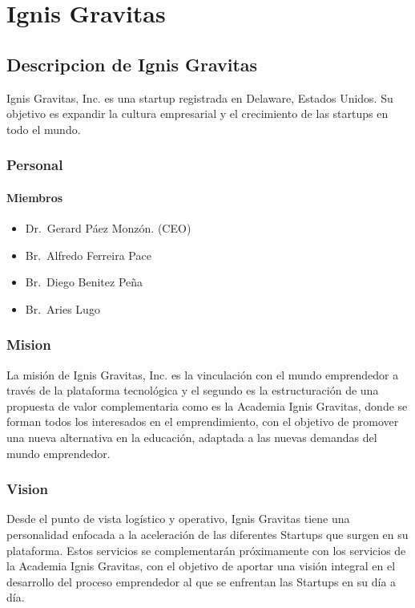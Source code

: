\chapter{Ignis Gravitas}

\section{Descripcion de Ignis Gravitas} \label{App:DescripcionLasdai}

Ignis Gravitas, Inc. es una startup registrada en Delaware, Estados Unidos. Su objetivo es expandir la cultura empresarial y el crecimiento de las startups en todo el mundo.

\subsection{Personal}

\subsubsection{Miembros}

\begin{itemize}
    \itemsep1pt \parskip0pt 
    \item Dr.\ Gerard Páez Monzón. (CEO)
    \item Br.\ Alfredo Ferreira Pace
    \item Br.\ Diego Benitez Peña
    \item Br.\ Aries Lugo
\end{itemize}

\subsection{Mision}

La misión de Ignis Gravitas, Inc. es la vinculación con el mundo emprendedor a través de la plataforma tecnológica y el segundo es la estructuración de una propuesta de valor complementaria como es la Academia Ignis Gravitas, donde se forman todos los interesados en el emprendimiento, con el objetivo de promover una nueva alternativa en la educación, adaptada a las nuevas demandas del mundo emprendedor.

\subsection{Vision}

Desde el punto de vista logístico y operativo, Ignis Gravitas tiene una personalidad enfocada a la aceleración de las diferentes Startups que surgen en su plataforma. Estos servicios se complementarán próximamente con los servicios de la Academia Ignis Gravitas, con el objetivo de aportar una visión integral en el desarrollo del proceso emprendedor al que se enfrentan las Startups en su día a día.
